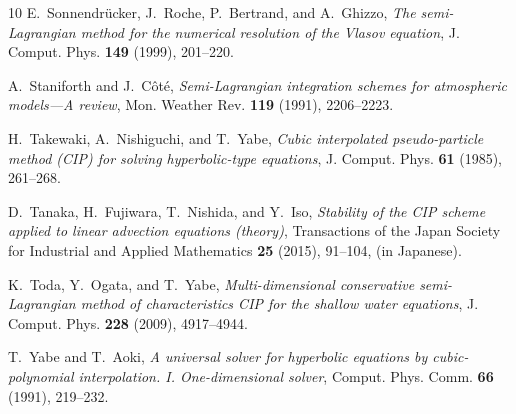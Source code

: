 \documentclass[10pt,a4paper,tbtags,leqno]{amsart}
\theoremstyle{definition}
\numberwithin{equation}{section}
\begin{document}
\begin{thebibliography}{10}
E.~Sonnendr{\"u}cker, J.~Roche, P.~Bertrand, and A.~Ghizzo, \emph{The semi-{L}agrangian method for the numerical resolution of the {V}lasov equation}, J. Comput. Phys. \textbf{149} (1999), 201--220.

A.~Staniforth and J.~C{\^o}t{\'e}, \emph{Semi-{L}agrangian integration schemes for atmospheric models---{A} review}, Mon. Weather Rev. \textbf{119} (1991), 2206--2223.

H.~Takewaki, A.~Nishiguchi, and T.~Yabe, \emph{Cubic interpolated pseudo-particle method ({CIP}) for solving hyperbolic-type equations}, J. Comput. Phys. \textbf{61} (1985), 261--268.

D.~Tanaka, H.~Fujiwara, T.~Nishida, and Y.~Iso, \emph{Stability of the {CIP} scheme applied to linear advection equations (theory)}, Transactions of the Japan Society for Industrial and Applied Mathematics \textbf{25} (2015), 91--104, (in Japanese).

K.~Toda, Y.~Ogata, and T.~Yabe, \emph{Multi-dimensional conservative semi-{L}agrangian method of characteristics {CIP} for the shallow water equations}, J. Comput. Phys. \textbf{228} (2009), 4917--4944.

T.~Yabe and T.~Aoki, \emph{A universal solver for hyperbolic equations by cubic-polynomial interpolation. {I}. {O}ne-dimensional solver}, Comput. Phys. Comm. \textbf{66} (1991), 219--232.

\end{thebibliography}
\end{document}
